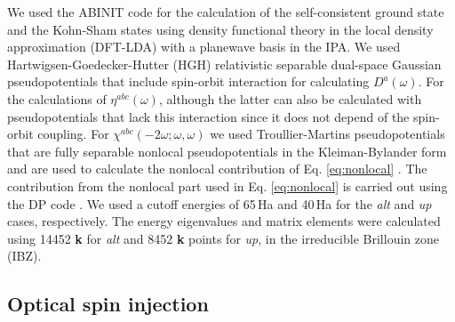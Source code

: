 \documentclass[pss]{wiley2sp} %
\begin{document}
We used the ABINIT code \cite{gonzeCPC09} for the calculation of the self-consistent ground state and the Kohn-Sham states using density functional theory in the local density approximation (DFT-LDA) with a planewave basis in the IPA. We used Hartwigsen-Goedecker-Hutter (HGH) relativistic separable dual-space Gaussian pseudopotentials \cite{hartwigsenPRB98} that include spin-orbit interaction for calculating $D^{a}(\omega)$. For the calculations of {$\eta^{abc}(\omega)$}, although the latter can also be calculated with pseudopotentials that lack this interaction since it does not depend of the spin-orbit coupling. For $\chi^{abc}(-2\omega;\omega,\omega)$ we used Troullier-Martins pseudopotentials \cite{troullierPRB91} that are fully separable nonlocal pseudopotentials in the Kleiman-Bylander form and are used to calculate the nonlocal contribution of Eq. \eqref{eq:nonlocal} \cite{kleinmanPRL82}. The contribution from the nonlocal part used in Eq. \eqref{eq:nonlocal} is carried out using the DP code \cite{olevanoDP}. We used a cutoff energies of 65\,Ha and 40\,Ha for the \emph{alt} and \emph{up} cases, respectively. The energy eigenvalues and matrix elements were calculated using 14452 \textbf{k} for \emph{alt} and 8452 \textbf{k} points for \emph{up}, in the irreducible Brillouin zone (IBZ).

\subsection{Optical spin injection}\label{subsec:results-DSP}
\end{document}
